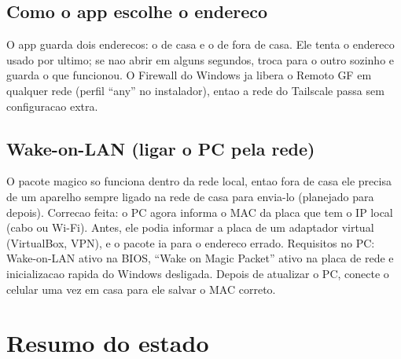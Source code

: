 \documentclass[11pt,a4paper]{article}
\begin{document}
\subsection{Como o app escolhe o endereco}
O app guarda dois enderecos: o de casa e o de fora de casa. Ele tenta o endereco usado por
ultimo; se nao abrir em alguns segundos, troca para o outro sozinho e guarda o que
funcionou. O Firewall do Windows ja libera o Remoto GF em qualquer rede (perfil ``any'' no
instalador), entao a rede do Tailscale passa sem configuracao extra.

\subsection{Wake-on-LAN (ligar o PC pela rede)}
O pacote magico so funciona dentro da rede local, entao fora de casa ele precisa de um
aparelho sempre ligado na rede de casa para envia-lo (planejado para depois). Correcao feita:
o PC agora informa o MAC da placa que tem o IP local (cabo ou Wi-Fi). Antes, ele podia
informar a placa de um adaptador virtual (VirtualBox, VPN), e o pacote ia para o endereco
errado. Requisitos no PC: Wake-on-LAN ativo na BIOS, ``Wake on Magic Packet'' ativo na placa
de rede e inicializacao rapida do Windows desligada. Depois de atualizar o PC, conecte o
celular uma vez em casa para ele salvar o MAC correto.

\section{Resumo do estado}
\end{document}
